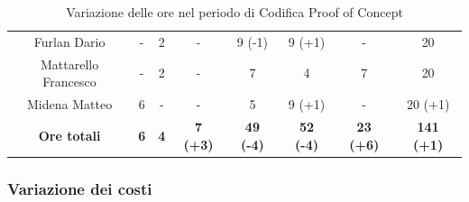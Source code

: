 \begin{table}[H]
\begin{tabular}{c|c|c|c|c|c|c|c}
    Furlan Dario         & -                                                             & 2          & -               & 9 (-1)           & 9 (+1)           & -                & 20                \\
    Mattarello Francesco & -                                                             & 2          & -               & 7                & 4                & 7                & 20                \\
    Midena Matteo        & 6                                                             & -          & -               & 5                & 9 (+1)           & -                & 20 (+1)           \\
    \textbf{Ore totali}  & \textbf{6}                                                    & \textbf{4} & \textbf{7 (+3)} & \textbf{49 (-4)} & \textbf{52 (-4)} & \textbf{23 (+6)} & \textbf{141 (+1)}
  \end{tabular}
  \caption{Variazione delle ore nel periodo di Codifica Proof of Concept}
\end{table}

\subsubsection{Variazione dei costi} \label{subsubsection:variazione_costi_Poc}


